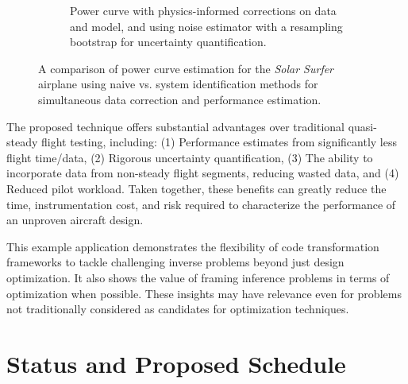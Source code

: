 \documentclass[12pt,vi,oneside,table]{report}
\begin{document}
\begin{figure}[h]
\begin{subfigure}[b]{0.8\textwidth}
            \caption{Power curve with physics-informed corrections on data and model, and using noise estimator with a resampling bootstrap for uncertainty quantification.}
            \label{fig:power_curve_with_physics}
        \end{subfigure}

        \caption{A comparison of power curve estimation for the \textit{Solar Surfer} airplane using naive vs. system identification methods for simultaneous data correction and performance estimation.}
        \label{fig:power_curve_comparison}
    \end{figure}

    The proposed technique offers substantial advantages over traditional quasi-steady flight testing, including: (1) Performance estimates from significantly less flight time/data, (2) Rigorous uncertainty quantification, (3) The ability to incorporate data from non-steady flight segments, reducing wasted data, and (4) Reduced pilot workload. Taken together, these benefits can greatly reduce the time, instrumentation cost, and risk required to characterize the performance of an unproven aircraft design.

    This example application demonstrates the flexibility of code transformation frameworks to tackle challenging inverse problems beyond just design optimization. It also shows the value of framing inference problems in terms of optimization when possible. These insights may have relevance even for problems not traditionally considered as candidates for optimization techniques.


    \chapter{Status and Proposed Schedule}
    \label{sec:status}
\end{document}
